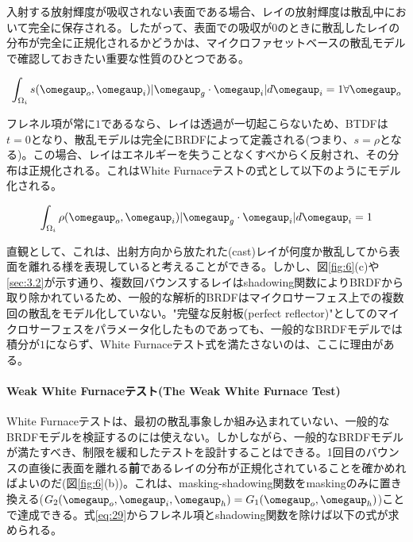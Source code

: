 \documentclass[a4j,xelatex,ja=standard]{bxjsarticle}
\begin{document}
入射する放射輝度が吸収されない表面である場合、レイの放射輝度は散乱中において完全に保存される。したがって、表面での吸収が$0$のときに散乱したレイの分布が完全に正規化されるかどうかは、マイクロファセットベースの散乱モデルで確認しておきたい重要な性質のひとつである。

\begin{equation}
    \int_{\Omega_i} s(\boldsymbol{\omegaup}_o, \boldsymbol{\omegaup}_i) |\boldsymbol{\omegaup}_g \cdot \boldsymbol{\omegaup}_i| d\boldsymbol{\omegaup}_i = 1 \forall \boldsymbol{\omegaup}_o
    \label{eq:33}
\end{equation}

フレネル項が常に$1$であるなら、レイは透過が一切起こらないため、BTDFは$t = 0$となり、散乱モデルは完全にBRDFによって定義される(つまり、$s = \rho$となる)。この場合、レイはエネルギーを失うことなくすべからく反射され、その分布は正規化される。これはWhite Furnaceテストの式として以下のようにモデル化される。

\begin{equation}
    \int_{\Omega_i} \rho(\boldsymbol{\omegaup}_o, \boldsymbol{\omegaup}_i) |\boldsymbol{\omegaup}_g \cdot \boldsymbol{\omegaup}_i| d\boldsymbol{\omegaup}_i = 1
    \label{eq:34}
\end{equation}

直観として、これは、出射方向から放たれた(cast)レイが何度か散乱してから表面を離れる様を表現していると考えることができる。しかし、図\ref{fig:6}(c)や\ref{sec:3.2}が示す通り、複数回バウンスするレイはshadowing関数によりBRDFから取り除かれているため、一般的な解析的BRDFはマイクロサーフェス上での複数回の散乱をモデル化していない。"完璧な反射板(perfect reflector)"としてのマイクロサーフェスをパラメータ化したものであっても、一般的なBRDFモデルでは積分が$1$にならず、White Furnaceテスト式を満たさないのは、ここに理由がある。

\paragraph{Weak White Furnaceテスト(The Weak White Furnace Test)}

White Furnaceテストは、最初の散乱事象しか組み込まれていない、一般的なBRDFモデルを検証するのには使えない。しかしながら、一般的なBRDFモデルが満たすべき、制限を緩和したテストを設計することはできる。1回目のバウンスの直後に表面を離れる\textbf{前}であるレイの分布が正規化されていることを確かめればよいのだ(図\ref{fig:6}(b))。これは、masking-shadowing関数をmaskingのみに置き換える($G_2(\boldsymbol{\omegaup}_o, \boldsymbol{\omegaup}_i, \boldsymbol{\omegaup}_h) = G_1(\boldsymbol{\omegaup}_o, \boldsymbol{\omegaup}_h)$)ことで達成できる。式\eqref{eq:29}からフレネル項とshadowing関数を除けば以下の式が求められる。
\end{document}
